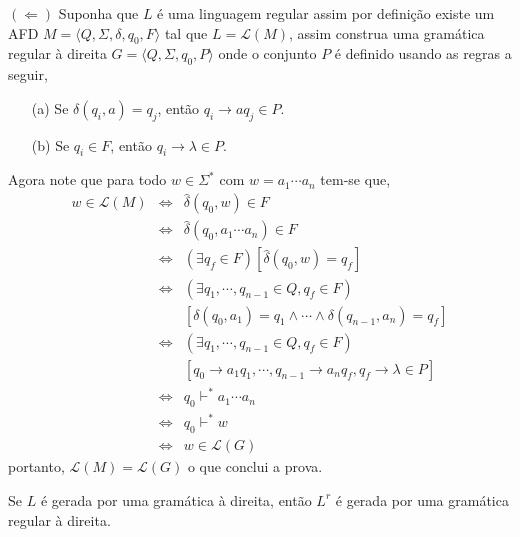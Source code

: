 \begin{prova}
	$(\Leftarrow)$ Suponha que $L$ é uma linguagem regular assim por definição existe um AFD $M = \langle Q, \Sigma, \delta, q_0, F \rangle$ tal que $L = \mathcal{L}(M)$, assim construa uma gramática regular à direita $G = \langle Q, \Sigma, q_0, P \rangle$ onde o conjunto $P$ é definido usando as regras a seguir, 
	\begin{itemize}
		\item[(a)] Se $\delta(q_i, a) = q_j$, então $q_i \rightarrow aq_j \in P$.
		\item[(b)] Se $q_i \in F$, então $q_i \rightarrow \lambda \in P$.
	\end{itemize} 
	Agora note que para todo $w \in \Sigma^*$ com $w = a_1 \cdots a_n$ tem-se que, 
	\begin{eqnarray*}
		w \in \mathcal{L}(M) & \Longleftrightarrow & \widehat{\delta}(q_0, w) \in F\\
		& \Longleftrightarrow & \widehat{\delta}(q_0, a_1 \cdots a_n) \in F\\
		& \Longleftrightarrow & (\exists q_f \in F)[\widehat{\delta}(q_0, w) = q_f]\\
		& \Longleftrightarrow & (\exists q_1, \cdots, q_{n-1} \in Q,  q_f \in F)\\
		& & [\delta(q_0, a_1) = q_1 \land \cdots \land \delta(q_{n-1}, a_n) = q_f]\\
		& \Longleftrightarrow & (\exists q_1, \cdots, q_{n-1} \in Q,  q_f \in F)\\
		& & [q_0 \rightarrow a_1q_1, \cdots, q_{n-1} \rightarrow a_nq_f, q_f \rightarrow \lambda \in P]\\
		& \Longleftrightarrow & q_0 \vdash^* a_1 \cdots a_n\\
		& \Longleftrightarrow & q_0 \vdash^* w\\
		& \Longleftrightarrow & w \in \mathcal{L}(G)
	\end{eqnarray*} 
	portanto, $\mathcal{L}(M) = \mathcal{L}(G)$ o que conclui a prova.
\end{prova}

\begin{lema}\label{lema:GRD-Reversa}
	Se $L$ é gerada por uma gramática à direita, então $L^r$ é gerada por uma gramática regular à direita.
\end{lema}

